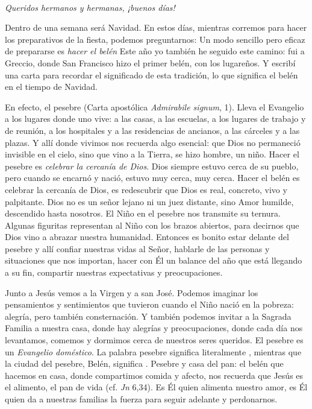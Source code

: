 ~

\emph{Queridos hermanos y hermanas, ¡buenos días!}

Dentro de una semana será Navidad. En estos días, mientras corremos para hacer los preparativos de la fiesta, podemos preguntarnos:  Un modo sencillo pero eficaz de prepararse es \emph{hacer el belén} Este año yo también he seguido este camino: fui a Greccio, donde San Francisco hizo el primer belén, con los lugareños. Y escribí una carta para recordar el significado de esta tradición, lo que significa el belén en el tiempo de Navidad.

En efecto, el pesebre  (Carta apostólica \emph{Admirabile signum}, 1). Lleva el Evangelio a los lugares donde uno vive: a las casas, a las escuelas, a los lugares de trabajo y de reunión, a los hospitales y a las residencias de ancianos, a las cárceles y a las plazas. Y allí donde vivimos nos recuerda algo esencial: que Dios no permaneció invisible en el cielo, sino que vino a la Tierra, se hizo hombre, un niño. Hacer el pesebre es \emph{celebrar la cercanía de Dios}. Dios siempre estuvo cerca de su pueblo, pero cuando se encarnó y nació, estuvo muy cerca, muy cerca. Hacer el belén es celebrar la cercanía de Dios, es redescubrir que Dios es real, concreto, vivo y palpitante. Dios no es un señor lejano ni un juez distante, sino Amor humilde, descendido hasta nosotros. El Niño en el pesebre nos transmite su ternura. Algunas figuritas representan al Niño con los brazos abiertos, para decirnos que Dios vino a abrazar nuestra humanidad. Entonces es bonito estar delante del pesebre y allí confiar nuestras vidas al Señor, hablarle de las personas y situaciones que nos importan, hacer con Él un balance del año que está llegando a su fin, compartir nuestras expectativas y preocupaciones.

Junto a Jesús vemos a la Virgen y a san José. Podemos imaginar los pensamientos y sentimientos que tuvieron cuando el Niño nació en la pobreza: alegría, pero también consternación. Y también podemos invitar a la Sagrada Familia a nuestra casa, donde hay alegrías y preocupaciones, donde cada día nos levantamos, comemos y dormimos cerca de nuestros seres queridos. El pesebre es un \emph{Evangelio doméstico}. La palabra pesebre significa literalmente , mientras que la ciudad del pesebre, Belén, significa . Pesebre y casa del pan: el belén que hacemos en casa, donde compartimos comida y afecto, nos recuerda que Jesús es el alimento, el pan de vida (cf. \emph{Jn} 6,34). Es Él quien alimenta nuestro amor, es Él quien da a nuestras familias la fuerza para seguir adelante y perdonarnos.

